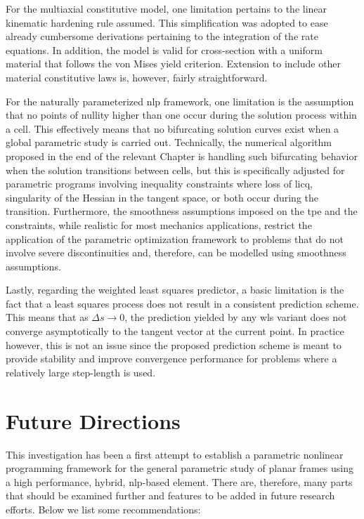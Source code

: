 For the multiaxial constitutive model, one limitation pertains to the linear 
kinematic 
hardening rule assumed. This simplification was adopted to ease already 
cumbersome 
derivations 
pertaining to the integration of the rate equations. In addition, the model is 
valid 
for cross-section with a uniform material that follows the von Mises yield 
criterion. 
Extension to include other material constitutive laws is, however, fairly 
straightforward.

For the naturally parameterized \acrshort{nlp} framework, one limitation is the 
assumption that no points of nullity higher than one occur during the solution 
process 
within a cell. This effectively means that no bifurcating solution curves exist 
when a 
global parametric study is carried out. Technically, the numerical algorithm 
proposed 
in the end of the relevant Chapter is handling such bifurcating behavior when 
the 
solution transitions between cells, but this is specifically adjusted for 
parametric 
programs involving inequality constraints where loss of \acrshort{licq}, 
singularity 
of the Hessian in the tangent space, or both occur during the transition. 
Furthermore, 
the smoothness assumptions imposed on the \acrshort{tpe} and the constraints, 
while 
realistic for most mechanics applications, restrict the application of the 
parametric optimization framework to problems that do not involve severe 
discontinuities and, therefore, can be modelled using smoothness assumptions.

Lastly, regarding the weighted least squares predictor, a basic limitation is 
the fact 
that a least squares process does not result in a consistent prediction scheme. 
This 
means that as $\Delta s\rightarrow 0$, the prediction yielded by any 
\acrshort{wls} 
variant does not converge asymptotically to the tangent vector at the current 
point. 
In practice however, this is not an issue since the proposed prediction scheme 
is 
meant to provide stability and improve convergence performance for problems 
where a 
relatively large step-length is used. 


\section{Future Directions}
This investigation has been a first attempt to establish a parametric nonlinear 
programming framework for the general parametric study of planar frames using a 
high 
performance, hybrid, \acrshort{nlp}-based element. There are, therefore, many 
parts 
that should be examined further and features to be added in future research 
efforts. 
Below we list some recommendations:

